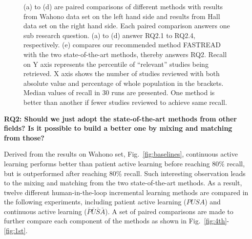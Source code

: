 \documentclass{svjour3}
\theoremstyle{break}
\begin{document}
\begin{figure}
    \centering
    
    \quad
    \quad
    \quad
    \quad
    
    
    
    \caption{(a) to (d) are paired comparisons of different methods with results from Wahono data set on the left hand side and results from Hall data set on the right hand side. Each paired comparison answers one sub research question. (a) to (d) answer RQ2.1 to RQ2.4, respectively. (e) compares our recommended method FASTREAD with the two state-of-the-art methods, thereby answers RQ2. Recall on Y axis represents the percentile of ``relevant'' studies being retrieved. X axis shows the number of studies reviewed with both absolute value and percentage of whole population in the brackets. Median values of recall in $30$ runs are presented.  One method is better than another if fewer studies reviewed to achieve same recall.
    }
    \label{fig:detail}
\end{figure}



{\bf RQ2: Should we just adopt the state-of-the-art methods from other fields? Is it possible to build a better one by mixing and matching from those?}

Derived from the results on Wahono set, Fig.~\ref{fig:baselines}, continuous active learning performs better than patient active learning before reaching $80\%$ recall, but is outperformed after reaching $80\%$ recall. Such interesting observation leads to the mixing and matching from the two state-of-the-art methods. As a result, twelve different human-in-the-loop incremental learning methods are compared in the following experiments, including patient active learning ($PUSA$) and continuous active learning ($\bar{P}\bar{U}\bar{S}\bar{A}$).  A set of paired comparisons are made to further compare each component of the methods as shown in Fig.~\ref{fig:4th}-\ref{fig:1st}.
\end{document}
